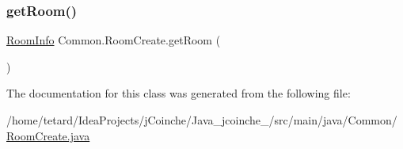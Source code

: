 \mbox{\label{classCommon_1_1RoomCreate_a4bff6a47b84ef3350987e80977e0f017}} 
\subsubsection{\texorpdfstring{get\+Room()}{getRoom()}}
{\footnotesize\ttfamily \mbox{\hyperlink{classCommon_1_1RoomInfo}{Room\+Info}} Common.\+Room\+Create.\+get\+Room (\begin{DoxyParamCaption}{ }\end{DoxyParamCaption})\hspace{0.3cm}{\ttfamily [inline]}}



The documentation for this class was generated from the following file\+:\begin{DoxyCompactItemize}
\item 
/home/tetard/\+Idea\+Projects/j\+Coinche/\+Java\+\_\+jcoinche\+\_/src/main/java/\+Common/\mbox{\hyperlink{RoomCreate_8java}{Room\+Create.\+java}}\end{DoxyCompactItemize}
